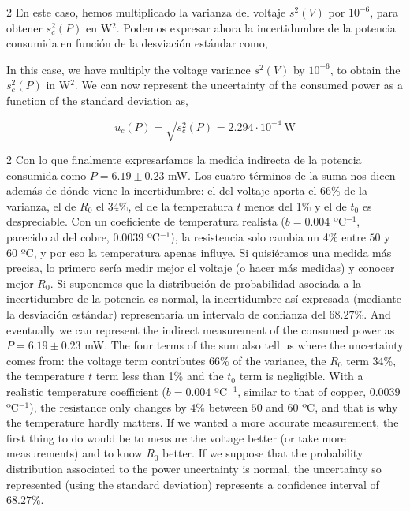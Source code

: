 \begin{paracol}{2}
En este caso, hemos multiplicado la varianza del voltaje $s^2(V)$ por $10^{-6}$, para obtener $s_c^2(P)$ en W$^2$. Podemos expresar ahora la incertidumbre de la potencia consumida en función de la desviación estándar como,

\switchcolumn
In this case, we have multiply the voltage variance $s^2(V)$ by $10^{-6}$, to obtain the $s_c^2(P)$ in W$^2$. We can now represent the uncertainty of the consumed power as a function of the standard deviation as,
\end{paracol}
\begin{equation*}
u_c(P) = \sqrt{s_c^2(P)} =  2.294\cdot 10^{-4}\ \mathrm{W}
\end{equation*}
\begin{paracol}{2}
Con lo que finalmente expresaríamos la medida indirecta de la potencia consumida como $P = 6.19 \pm 0.23$ mW. Los cuatro términos de la suma nos dicen además de dónde viene la incertidumbre: el del voltaje aporta el 66\% de la varianza, el de $R_0$ el 34\%, el de la temperatura $t$ menos del 1\% y el de $t_0$ es despreciable. Con un coeficiente de temperatura realista ($b=0.004$ ºC$^{-1}$, parecido al del cobre, $0.0039$ ºC$^{-1}$), la resistencia solo cambia un 4\% entre $50$ y $60$ ºC, y por eso la temperatura apenas influye. Si quisiéramos una medida más precisa, lo primero sería medir mejor el voltaje (o hacer más medidas) y conocer mejor $R_0$. Si suponemos que la distribución de probabilidad asociada a la incertidumbre de la potencia es normal, la incertidumbre así expresada (mediante la desviación estándar) representaría un intervalo de confianza del $68.27\%$. 
\switchcolumn
And eventually we can represent the indirect measurement of the consumed power as $P = 6.19 \pm 0.23$ mW. The four terms of the sum also tell us where the uncertainty comes from: the voltage term contributes 66\% of the variance, the $R_0$ term 34\%, the temperature $t$ term less than 1\% and the $t_0$ term is negligible. With a realistic temperature coefficient ($b=0.004$ ºC$^{-1}$, similar to that of copper, $0.0039$ ºC$^{-1}$), the resistance only changes by 4\% between $50$ and $60$ ºC, and that is why the temperature hardly matters. If we wanted a more accurate measurement, the first thing to do would be to measure the voltage better (or take more measurements) and to know $R_0$ better. If we suppose that the probability distribution associated to the power uncertainty is normal, the uncertainty so represented (using the standard deviation) represents a confidence interval of $68.27\%$.
\end{paracol}


